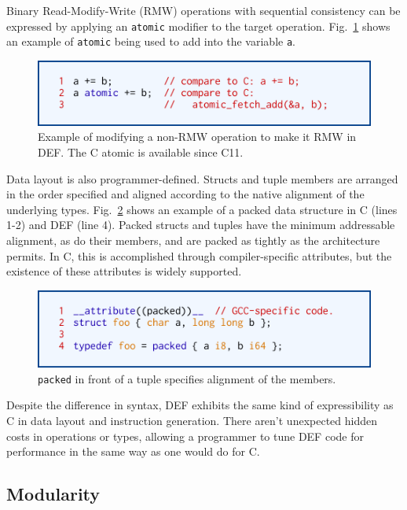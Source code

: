 Binary Read-Modify-Write (RMW) operations with sequential consistency can be expressed by applying an \texttt{atomic} modifier to the target operation.  Fig.~\ref{fig:atomic} shows an example of \texttt{atomic} being used to add into the variable \texttt{a}.

\begin{figure}[htbp!]
        \centering
        \includegraphics[scale=0.25]{gfx/atomic}
        \caption{Example of modifying a non-RMW operation to make it RMW in DEF.  The C atomic is available since C11.}
        \label{fig:atomic}
\end{figure}

Data layout is also programmer-defined.  Structs and tuple members are arranged in the order specified and aligned according to the native alignment of the underlying types.  Fig.~\ref{fig:packed} shows an example of a packed data structure in C (lines 1-2) and DEF (line 4).  Packed structs and tuples have the minimum addressable alignment, as do their members, and are packed as tightly as the architecture permits.  In C, this is accomplished through compiler-specific attributes, but the existence of these attributes is widely supported.

\begin{figure}[htbp!]
        \centering
        \includegraphics[scale=0.25]{gfx/packed}
        \caption{\texttt{packed} in front of a tuple specifies alignment of the members.}
        \label{fig:packed}
\end{figure}

Despite the difference in syntax, DEF exhibits the same kind of expressibility as C in data layout and instruction generation.  There aren't unexpected hidden costs in operations or types, allowing a programmer to tune DEF code for performance in the same way as one would do for C.

\subsection{Modularity}

